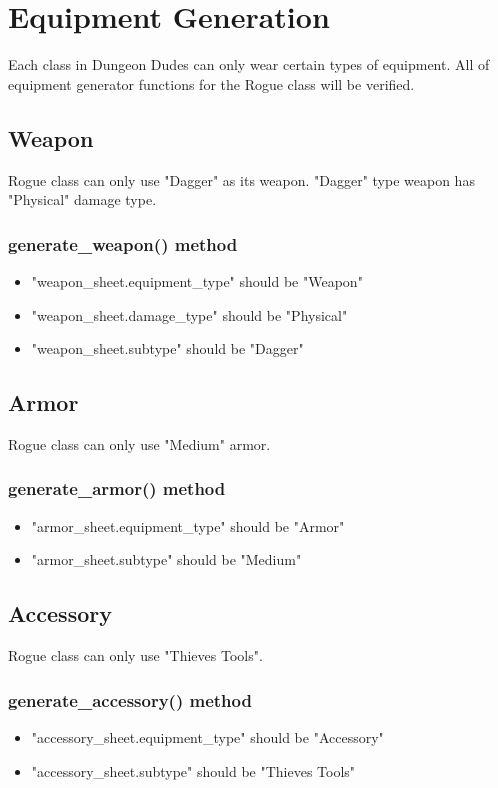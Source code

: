 \documentclass[12pt]{article} %
\begin{document}
\section{Equipment Generation}
Each class in Dungeon Dudes can only wear certain types of equipment. All of equipment generator functions for the Rogue class will be verified.

\subsection{Weapon}
Rogue class can only use "Dagger" as its weapon. "Dagger" type weapon has "Physical" damage type.

\subsubsection*{generate\_weapon() method}
\begin{itemize}
    \item "weapon\_sheet.equipment\_type" should be "Weapon"
    \item "weapon\_sheet.damage\_type" should be "Physical"
    \item "weapon\_sheet.subtype" should be "Dagger"
\end{itemize}

\subsection{Armor}
Rogue class can only use "Medium" armor.

\subsubsection*{generate\_armor() method}
\begin{itemize}
    \item "armor\_sheet.equipment\_type" should be "Armor"
    \item "armor\_sheet.subtype" should be "Medium"
\end{itemize}

\subsection{Accessory}
Rogue class can only use "Thieves Tools".

\subsubsection*{generate\_accessory() method}
\begin{itemize}
    \item "accessory\_sheet.equipment\_type" should be "Accessory"
    \item "accessory\_sheet.subtype" should be "Thieves Tools"
\end{itemize}
\end{document}
